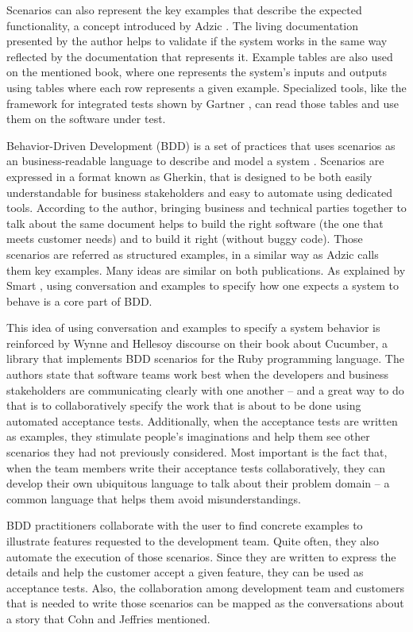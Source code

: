Scenarios can also represent the key examples that describe the expected functionality, a concept introduced by Adzic \cite{Adzic_2011}. The living documentation presented by the author helps to validate if the system works in the same way reflected by the documentation that represents it. Example tables are also used on the mentioned book, where one represents the system's inputs and outputs using tables where each row represents a given example. Specialized tools, like the framework for integrated tests shown by Gartner \cite{Gartner_2012}, can read those tables and use them on the software under test. 

Behavior-Driven Development (BDD) is a set of practices that uses scenarios as an business-readable language to describe and model a system \cite{Smart_2014}. Scenarios are expressed in a format known as Gherkin, that is designed to be both easily understandable for business stakeholders and easy to automate using dedicated tools. According to the author, bringing business and technical parties together to talk about the same document helps to build the right software (the one that meets customer needs) and to build it right (without buggy code). Those scenarios are referred as structured examples, in a similar way as Adzic \cite{Adzic_2011} calls them key examples. Many ideas are similar on both publications. As explained by Smart \cite{Smart_2014}, using conversation and examples to specify how one expects a system to behave is a core part of BDD. 

This idea of using conversation and examples to specify a system behavior is reinforced by Wynne and Hellesoy \cite{Wynne_and_Hellesoy_2012} discourse on their book about Cucumber, a library that implements BDD scenarios for the Ruby programming language. The authors state that software teams work best when the developers and business stakeholders are communicating clearly with one another -- and a great way to do that is to collaboratively specify the work that is about to be done using automated acceptance tests. Additionally, when the acceptance tests are written as examples, they stimulate people’s imaginations and help them see other scenarios they had not previously considered. Most important is the fact that, when the team members write their acceptance tests collaboratively, they can develop their own ubiquitous language to talk about their problem domain -- a common language that helps them avoid misunderstandings.

BDD practitioners collaborate with the user to find concrete examples to illustrate features requested to the development team. Quite often, they also automate the execution of those scenarios. Since they are written to express the details and help the customer accept a given feature, they can be used as acceptance tests. Also, the collaboration among development team and customers that is needed to write those scenarios can be mapped as the conversations about a story that Cohn \cite{Cohn_2004} and Jeffries \cite{Jeffries_2001} mentioned.

